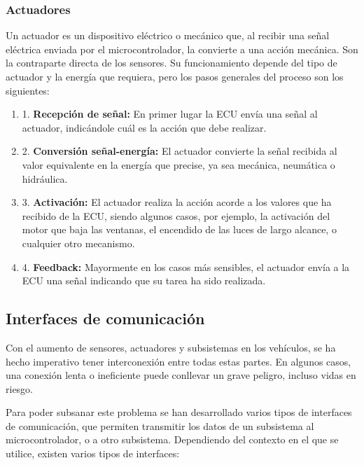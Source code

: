 \subsubsection*{Actuadores}

Un actuador es un dispositivo eléctrico o mecánico que, al recibir una señal eléctrica enviada por el microcontrolador, la convierte a una acción mecánica. Son la contraparte directa de los sensores. Su funcionamiento depende del tipo de actuador y la energía que requiera, pero los pasos generales del proceso son los siguientes:

\begin{enumerate}
    \item 1. \textbf{Recepción de señal:} En primer lugar la ECU envía una señal al actuador, indicándole cuál es la acción que debe realizar. 
    \item 2. \textbf{Conversión señal-energía:} El actuador convierte la señal recibida al valor equivalente en la energía que precise, ya sea mecánica, neumática o hidráulica. 
    \item 3. \textbf{Activación:} El actuador realiza la acción acorde a los valores que ha recibido de la ECU, siendo algunos casos, por ejemplo, la activación del motor que baja las ventanas, el encendido de las luces de largo alcance, o cualquier otro mecanismo. 
    \item 4. \textbf{Feedback:} Mayormente en los casos más sensibles, el actuador envía a la ECU una señal indicando que su tarea ha sido realizada.
\end{enumerate}

\subsection{Interfaces de comunicación}
Con el aumento de sensores, actuadores y subsistemas en los vehículos, se ha hecho imperativo tener interconexión entre todas estas partes. En algunos casos, una conexión lenta o ineficiente puede conllevar un grave peligro, incluso vidas en riesgo. 

Para poder subsanar este problema se han desarrollado varios tipos de interfaces de comunicación, que permiten transmitir los datos de un subsistema al microcontrolador, o a otro subsistema. Dependiendo del contexto en el que se utilice, existen varios tipos de interfaces:

